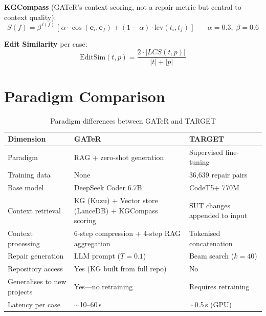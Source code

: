 \documentclass[11pt,a4paper]{article}
\begin{document}
\textbf{KGCompass} (GATeR's context scoring, not a repair metric but
central to context quality):
\begin{equation}
    S(f) = \beta^{\,l(f)} \;\Big[\;
        \alpha \cdot \cos(\mathbf{e}_i, \mathbf{e}_f)
        + (1{-}\alpha) \cdot \text{lev}(t_i, t_f)
    \;\Big]
    \qquad \alpha{=}0.3,\; \beta{=}0.6
\end{equation}

\textbf{Edit Similarity} per case:
\begin{equation}
    \text{EditSim}(t,p) = \frac{2 \cdot |LCS(t, p)|}{|t| + |p|}
\end{equation}

\section{Paradigm Comparison}

\begin{table}[h]
\centering
\caption{Paradigm differences between GATeR and TARGET}
\renewcommand{\arraystretch}{1.2}
\begin{tabular}{@{}p{3.6cm}p{5.2cm}p{5.2cm}@{}}
\toprule
\textbf{Dimension} & \textbf{GATeR} & \textbf{TARGET} \\
\midrule
Paradigm & RAG + zero-shot generation & Supervised fine-tuning \\
Training data & None & 36,639 repair pairs \\
Base model & DeepSeek Coder 6.7B & CodeT5+ 770M \\
Context retrieval & KG (Kuzu) + Vector store (LanceDB)
                    + KGCompass scoring
                  & SUT changes appended to input \\
Context processing & 6-step compression + 4-step RAG
                     aggregation
                   & Tokenised concatenation \\
Repair generation & LLM prompt ($T{=}0.1$) & Beam search ($k{=}40$) \\
Repository access & Yes (KG built from full repo) & No \\
Generalises to new projects & Yes---no retraining & Requires retraining \\
Latency per case & $\sim$10--60\,s & $\sim$0.5\,s (GPU) \\
\bottomrule
\end{tabular}
\end{table}
\end{document}
